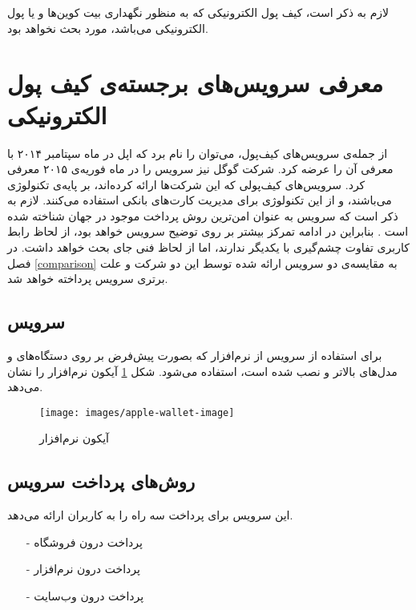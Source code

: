 \documentclass[oneside]{report}
\begin{document}
			  لازم به ذکر است، کیف پول الکترونیکی که به منظور نگهداری بیت کوین‌ها
			  و یا پول الکترونیکی می‌باشد، مورد بحث نخواهد بود.
			  
				\section{معرفی سرویس‌های برجسته‌ی کیف پول الکترونیکی }
		
		از جمله‌ی سرویس‌های کیف‌پول، می‌توان 
				{\normalsize {}} 
		را نام برد که اپل در ماه سپتامبر ۲۰۱۴ با معرفی 
				{\normalsize {}} 
		آن را عرضه کرد.	شرکت گوگل نیز سرویس 
						{\normalsize {}} 
		را در ماه فوریه‌ی ۲۰۱۵ معرفی کرد. سرویس‌های کیف‌پولی که این شرکت‌ها ارائه کرده‌اند، بر پایه‌ی تکنولوژی 
			{\normalsize {}}
			می‌باشند، و از این تکنولوژی برای مدیریت کارت‌های بانکی استفاده می‌کنند. لازم به ذکر است که سرویس 
						{\normalsize {}} 
						به عنوان امن‌ترین روش پرداخت موجود در جهان شناخته شده است 
						\cite{mostsecureBellID}.
						بنابراین در ادامه تمرکز بیشتر بر روی توضیح سرویس
							 									 {\normalsize {}}
							 									 خواهد بود، از لحاظ رابط کاربری تفاوت چشم‌گیری با یکدیگر ندارند، اما از لحاظ فنی جای بحث خواهد داشت.
			در فصل \ref{comparison} به مقایسه‌ی دو سرویس ارائه شده توسط این دو شرکت  و علت برتری سرویس
										{\normalsize {}} 
			پرداخته خواهد شد.
		
		\subsection{ سرویس {\normalsize{}}}
		برای استفاده از سرویس 
								{\normalsize {}} 
								از نرم‌افزار
														{\normalsize {}} 
		که بصورت پیش‌فرض بر روی دستگاه‌های
								{\normalsize {}} 
								و مدل‌های بالاتر و
						{\normalsize {}} 
								 نصب شده است،	 استفاده می‌شود. شکل  
								 \ref{wallet-image}
								 آیکون نرم‌افزار
							 										{\normalsize {}} 
را نشان می‌دهد.
								 
		\begin{figure}[h]
			\centering
			\texttt{[image: images/apple-wallet-image]}
			\caption{آیکون نرم‌افزار {\footnotesize {}} }
			\label{wallet-image}
		\end{figure}
	\subsection{روش‌های پرداخت سرویس {\normalsize {}} }
	این سرویس برای پرداخت سه راه را به کاربران ارائه می‌دهد.
	\begin{itemize}
		\item[-] پرداخت درون فروشگاه 
		‌\item[-] پرداخت درون نرم‌افزار
		\item[-]پرداخت درون وب‌سایت
	\end{itemize}
\end{document}
